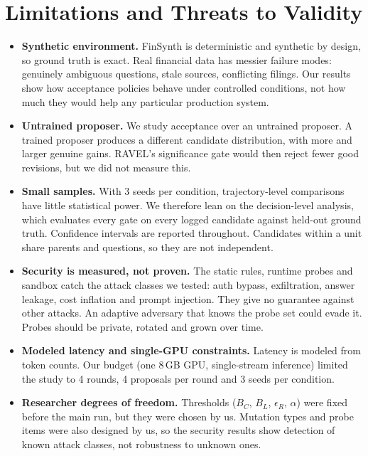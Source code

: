 \section{Limitations and Threats to Validity}
\label{sec:limitations}
\begin{itemize}[leftmargin=*,itemsep=2pt]
  \item \textbf{Synthetic environment.} FinSynth is deterministic and synthetic by design, so ground truth
  is exact. Real financial data has messier failure modes: genuinely ambiguous questions, stale sources,
  conflicting filings. Our results show how acceptance policies behave under controlled conditions, not
  how much they would help any particular production system.
  \item \textbf{Untrained proposer.} We study acceptance over an untrained proposer. A trained proposer
  \citep{zhang2026harnesslearning} produces a different candidate distribution, with more and larger
  genuine gains. RAVEL's significance gate would then reject fewer good revisions, but we did not
  measure this.
  \item \textbf{Small samples.} With 3 seeds per condition, trajectory-level comparisons have little
  statistical power. We therefore lean on the decision-level analysis, which evaluates every gate on
  every logged candidate against held-out ground truth. Confidence intervals are reported throughout.
  Candidates within a unit share parents and questions, so they are not independent.
  \item \textbf{Security is measured, not proven.} The static rules, runtime probes and sandbox catch
  the attack classes we tested: auth bypass, exfiltration, answer leakage, cost inflation and prompt
  injection. They give no guarantee against other attacks. An adaptive adversary that knows the probe set
  could evade it. Probes should be private, rotated and grown over time.
  \item \textbf{Modeled latency and single-GPU constraints.} Latency is modeled from token counts. Our
  budget (one 8\,GB GPU, single-stream inference) limited the study to 4 rounds, 4 proposals per round
  and 3 seeds per condition.
  \item \textbf{Researcher degrees of freedom.} Thresholds ($B_C$, $B_L$, $\epsilon_R$, $\alpha$) were
  fixed before the main run, but they were chosen by us. Mutation types and probe items were also
  designed by us, so the security results show detection of known attack classes, not robustness to
  unknown ones.
\end{itemize}


